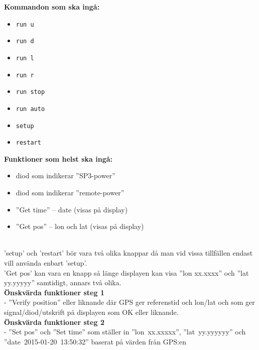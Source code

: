 \documentclass[a4paper]{article}
\begin{document}
		\begin{minipage}[t]{0.5\textwidth}
		\noindent \textbf{Kommandon som ska ingå:}
			\begin{itemize}
				\item \texttt{run u}
				\item \texttt{run d}
				\item \texttt{run l}
				\item \texttt{run r}
				\item \texttt{run stop}
				\item \texttt{run auto}
				\item \texttt{setup}
				\item \texttt{restart }
			\end{itemize}
		\end{minipage}
		\begin{minipage}[t]{0.5\textwidth}
			\noindent \textbf{Funktioner som helst ska ingå:}
			\begin{itemize}
				\item  diod som indikerar ”SP3-power”
				\item  diod som indikerar ”remote-power”
				\item  ”Get time” -- date (visas på display)
				\item  ”Get pos” -- lon och lat (visas på display)
			\end{itemize}
		\end{minipage} \\

		\vspace{2mm}\noindent 'setup' och 'restart' bör vara två olika knappar då man vid vissa tillfällen endast vill använda enbart 'setup'.\\

		\noindent 'Get pos' kan vara en knapp så länge displayen kan visa ''lon xx.xxxx'' och ''lat yy.yyyyy'' samtidigt, annars två olika. \\

		\noindent \textbf{Önskvärda funktioner steg 1} \\
		-	”Verify position” eller liknande där GPS ger referenstid och lon/lat och som ger signal/diod/utskrift på displayen som OK eller liknande. \\


		\noindent \textbf{Önskvärda funktioner steg 2} \\
		-	”Set pos” och ”Set time” som ställer in \hbox{''lon xx.xxxxx''}, \hbox{''lat yy.yyyyyy''} och \hbox{''date 2015-01-20 13:50:32''} baserat på värden från GPS:en \\
\end{document}
